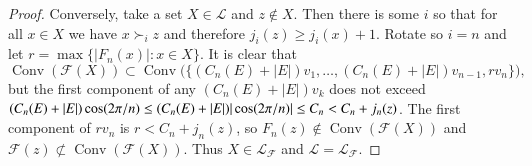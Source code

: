 \documentclass[12pt]{elsarticle}
\theoremstyle{plain}
\theoremstyle{definition}
\newcommand{\F}{\mathcal{F}}
\newcommand{\cgeom}{\mathcal{L}}
\DeclareMathOperator{\Hull}{Conv}
\begin{document}
\begin{proof}
Conversely, take a set $X \in\cgeom$ and $z\notin X$. Then there is some $i$ so that for all $x\in X$ we have $x \succ_i z$ and therefore $j_{i}(z)\geq j_{i}(x)+1$.  Rotate so $i=n$ and let $r=\max\{|F_{n}(x)|:x\in X\}$.  It is clear that
\begin{equation*}
	\Hull(\F(X))\subset \Hull \bigl( \{ (C_{n}(E)+|E|)v_{1},\dotsc,  (C_{n}(E)+|E|)v_{n-1},rv_{n}\} \bigr),
	\end{equation*}
but the first component of any $ (C_{n}(E)+|E|)v_{k}$ does not exceed $(C_{n}(E)+|E|)\cos(2\pi/n)\leq \linebreak (C_{n}(E)+|E|)|\cos(2\pi/n)|\leq C_{n}<C_{n}+j_{n}(z)$. The first component of $rv_{n}$ is $r<C_{n}+j_{n}(z)$, so $F_{n}(z)\not\in\Hull(\F(X))$ and $\F(z)\not\subset\Hull(\F(X))$.  Thus $X\in\cgeom_{\F}$ and $\cgeom=\cgeom_{\F}$.
%
%
%
\end{proof}
\end{document}
